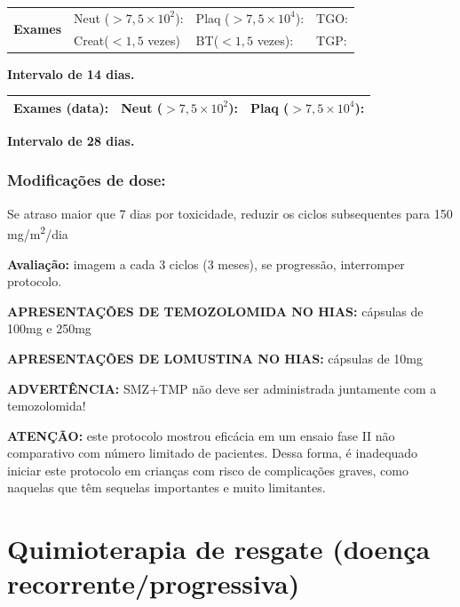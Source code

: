 \documentclass[11pt,a4paper,oldfontcommands]{memoir}
\begin{document}
\begin{center}
\begin{table}[H]
\begin{tabular}{p{1cm}p{5cm}|p{1cm}|p{4.5cm}|p{2cm}}
    \hline
    \multicolumn{1}{c|}{\multirow{2}{*}{\textbf{Exames}}}&\multicolumn{2}{l|}{Neut (\(>7,5\times10^2\)):}&{Plaq (\(>7,5\times10^4\)):}&{TGO:}\\
    \cline{2-5}
    \multicolumn{1}{c|}{\multirow{2}{*}{{}}}&\multicolumn{2}{l|}{Creat(\(<1,5\) vezes)}&{BT(\(<1,5\) vezes):}&{TGP:}
    \\
    \hline
\end{tabular}
\end{table}
\textbf{Intervalo de 14 dias.}
\begin{table}[H]
\begin{tabular}{p{5cm}|p{5cm}|p{4.7cm}}
    \hline
    \textbf{Exames (data):}&{Neut (\(>7,5\times10^2\)):}&{Plaq (\(>7,5\times10^4\)):}
    \\
    \hline
\end{tabular}
\end{table}
\textbf{Intervalo de 28 dias.}
\end{center}


\subsection{Modificações de dose:}
Se atraso maior que 7 dias por toxicidade, reduzir os ciclos subsequentes para 150 mg/m\textsuperscript{2}/dia

\textbf{Avaliação:} imagem a cada 3 ciclos (3 meses), se progressão, interromper protocolo.

\textbf{APRESENTAÇÕES DE TEMOZOLOMIDA NO HIAS:} cápsulas de 100mg e 250mg

\textbf{APRESENTAÇÕES DE LOMUSTINA NO HIAS:} cápsulas de 10mg

\textbf{ADVERTÊNCIA:} SMZ+TMP não deve ser administrada juntamente com a temozolomida!

\textbf{ATENÇÃO:} este protocolo mostrou eficácia em um ensaio fase II não comparativo com número limitado de pacientes. Dessa forma, é inadequado iniciar este protocolo em crianças com risco de complicações graves, como naquelas que têm sequelas importantes e muito limitantes.

\cleardoublepage

\chapter{Quimioterapia de resgate (doença recorrente/progressiva)}

\cleardoublepage
\end{document}
